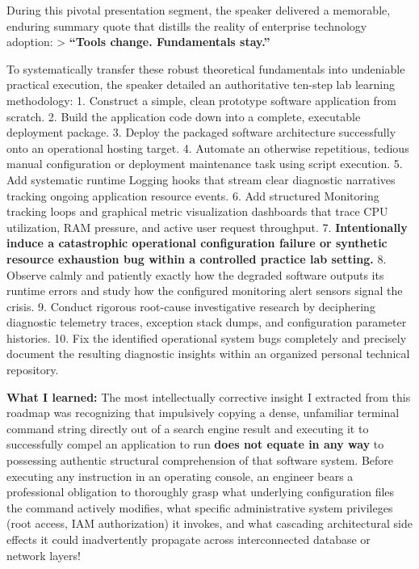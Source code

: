 During this pivotal presentation segment, the speaker delivered a
memorable, enduring summary quote that distills the reality of
enterprise technology adoption: \textgreater{} \textbf{``Tools change.
Fundamentals stay.''}

To systematically transfer these robust theoretical fundamentals into
undeniable practical execution, the speaker detailed an authoritative
ten-step lab learning methodology: 1. Construct a simple, clean
prototype software application from scratch. 2. Build the application
code down into a complete, executable deployment package. 3. Deploy the
packaged software architecture successfully onto an operational hosting
target. 4. Automate an otherwise repetitious, tedious manual
configuration or deployment maintenance task using script execution. 5.
Add systematic runtime Logging hooks that stream clear diagnostic
narratives tracking ongoing application resource events. 6. Add
structured Monitoring tracking loops and graphical metric visualization
dashboards that trace CPU utilization, RAM pressure, and active user
request throughput. 7. \textbf{Intentionally induce a catastrophic
operational configuration failure or synthetic resource exhaustion bug
within a controlled practice lab setting.} 8. Observe calmly and
patiently exactly how the degraded software outputs its runtime errors
and study how the configured monitoring alert sensors signal the crisis.
9. Conduct rigorous root-cause investigative research by deciphering
diagnostic telemetry traces, exception stack dumps, and configuration
parameter histories. 10. Fix the identified operational system bugs
completely and precisely document the resulting diagnostic insights
within an organized personal technical repository.

\textbf{What I learned:} The most intellectually corrective insight I
extracted from this roadmap was recognizing that impulsively copying a
dense, unfamiliar terminal command string directly out of a search
engine result and executing it to successfully compel an application to
run \textbf{does not equate in any way} to possessing authentic
structural comprehension of that software system. Before executing any
instruction in an operating console, an engineer bears a professional
obligation to thoroughly grasp what underlying configuration files the
command actively modifies, what specific administrative system
privileges (root access, IAM authorization) it invokes, and what
cascading architectural side effects it could inadvertently propagate
across interconnected database or network layers!

